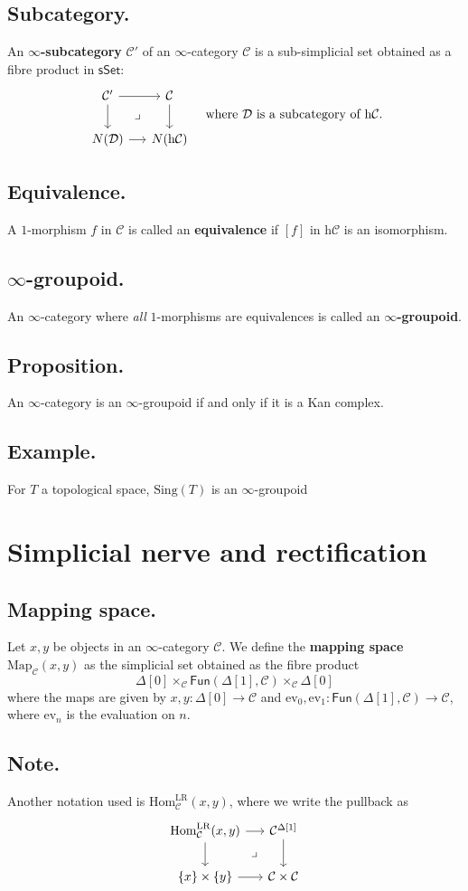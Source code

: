 \documentclass{article}
\numberwithin{equation}{subsection}
\renewcommand{\ss}[1]{\subsection{#1}}
\newcommand{\Hom}{\mathrm{Hom}}
\newcommand{\sset}{\mathsf{sSet}}
\newcommand{\C}{\mathcal{C}}
\newcommand{\h}{\mathrm{h}}
\newcommand{\Map}{\mathrm{Map}}
\begin{document}
        \ss{Subcategory.}
            An \textbf{$\infty$-subcategory} $\C'$ of an $\infty$-category $\C$ is a sub-simplicial set obtained as a fibre product in $\sset$:
            \[
                \begin{tikzcd}[row sep=.4em,column sep=0em]
                    \C' \ar{dd}\ar{rr} && \C \ar{dd}\\
                    &\lrcorner&\\
                    N(\mathcal{D}) \ar{rr} && N(\h\C)
                \end{tikzcd}
                \quad\text{where }\mathcal{D}\text{ is a subcategory of }\h\C.
            \]

        \ss{Equivalence.}
            A $1$-morphism $f$ in $\C$ is called an \textbf{equivalence} if $[f]$ in $\h\C$ is an isomorphism.

        \ss{$\infty$-groupoid.}
            An $\infty$-category where \emph{all} $1$-morphisms are equivalences is called an \textbf{$\infty$-groupoid}.

        \ss{Proposition.}
            An $\infty$-category is an $\infty$-groupoid if and only if it is a Kan complex.

        \ss{Example.}
            For $T$ a topological space, $\mathrm{Sing}(T)$ is an $\infty$-groupoid

    \section{Simplicial nerve and rectification}

        \ss{Mapping space.}
            Let $x,y$ be objects in an $\infty$-category $\C$.
            We define the \textbf{mapping space $\Map_\C(x,y)$} as the simplicial set obtained as the fibre product
            \[
                \Delta[0]\times_\C\mathsf{Fun}(\Delta[1],\C)\times_\C\Delta[0]
            \]
            where the maps are given by $x,y\colon\Delta[0]\to\C$ and $\mathrm{ev}_0,\mathrm{ev}_1\colon\mathsf{Fun}(\Delta[1],\C)\to\C$, where $\mathrm{ev}_n$ is the evaluation on $n$.

        \ss{Note.}
            Another notation used is $\Hom_\C^{\mathrm{LR}}(x,y)$, where we write the pullback as
            \[
                \begin{tikzcd}[row sep=.4em,column sep=0em]
                    \Hom_\C^{\mathrm{LR}}(x,y) \ar{dd}\ar{rr} && \C^{\Delta[1]} \ar{dd}\\
                    &\lrcorner&\\
                    \{x\}\times\{y\} \ar{rr} && \C\times\C
                \end{tikzcd}
            \]
\end{document}

